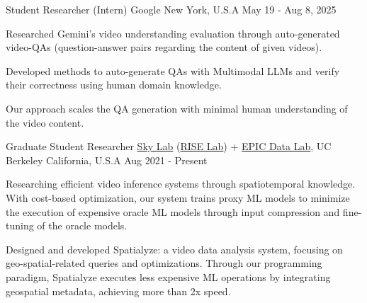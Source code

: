 

\begin{cventries}

  \cvwork
    {Student Researcher (Intern)} %
    {Google} %
    {New York, U.S.A} %
    {May 19 - Aug 8, 2025} %
    {
      \begin{cvitems} %
        \item{Researched Gemini's video understanding evaluation through auto-generated video-QAs (question-answer pairs regarding the content of given videos).}
        \item{Developed methods to auto-generate QAs with Multimodal LLMs and verify their correctness using human domain knowledge.}
        \item{Our approach scales the QA generation with minimal human understanding of the video content.}
      \end{cvitems}
    }

  \cvwork
    {Graduate Student Researcher} %
    {
        \href{https://sky.cs.berkeley.edu/}{Sky Lab}
        (\href{https://rise.cs.berkeley.edu/}{RISE Lab}) +
        \href{https://epic.berkeley.edu/}{EPIC Data Lab}, UC Berkeley
    } %
    {California, U.S.A} %
    {Aug 2021 - Present} %
    {
      \begin{cvitems} %
        \item{Researching efficient video inference systems through spatiotemporal knowledge.
        With cost-based optimization, our system trains proxy ML models to minimize the execution of expensive oracle ML models through input compression and fine-tuning of the oracle models.}
        \item{Designed and developed Spatialyze: a video data analysis system, focusing on geo-spatial-related queries and optimizations. Through our programming paradigm, Spatialyze executes less expensive ML operations by integrating geospatial metadata, achieving more than 2x speed.}
      \end{cvitems}
    }


\end{cventries}
